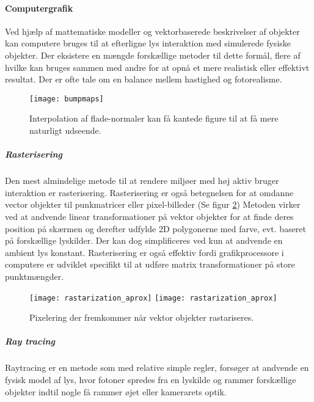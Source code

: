 \paragraph{Computergrafik}
Ved hjælp af mattematiske modeller og vektorbaserede beskrivelser af objekter kan computere bruges til at efterligne lys interaktion med simulerede fysiske objekter. Der eksistere en mængde forskællige metoder til dette formål, flere af hvilke kan bruges sammen med andre for at opnå et mere realistisk eller effektivt resultat. Der er ofte tale om en balance mellem hastighed og fotorealisme.
\begin{figure}[H]
    \texttt{[image: bumpmaps]}
    \caption{Interpolation af flade-normaler kan få kantede figure til at få mere naturligt udseende.}
    \label{fig:tid_versus_kvalitet}
\end{figure}
\subparagraph{Rasterisering}
Den mest almindelige metode til at rendere miljøer med høj aktiv bruger interaktion er rasterisering. Rasterisering er også betegnelsen for at omdanne vector objekter til punkmatricer eller pixel-billeder (Se figur \ref{fig:pixelering}) Metoden virker ved at andvende linear transformationer på vektor objekter for at finde deres position på skærmen og derefter udfylde 2D polygonerne med farve, evt. baseret på forskællige lyskilder. Der kan dog simplificeres ved kun at andvende en ambient lys konstant. Rasterisering er også effektiv fordi grafikprocessore i computere er udviklet specifikt til at udføre matrix transformationer på store punktmængder.
\begin{figure}[H]
    \centering
    \texttt{[image: rastarization\_aprox]}
    \texttt{[image: rastarization\_aprox]}
    \caption{Pixelering der fremkommer når vektor objekter rastariseres.}
    \label{fig:pixelering}
\end{figure}
\subparagraph{Ray tracing}
% 
Raytracing er en metode som med relative simple regler, forsøger at andvende en fysisk model af lys, hvor fotoner spredes fra en lyskilde og rammer forskællige objekter indtil nogle få rammer øjet eller kamerarets optik. 
